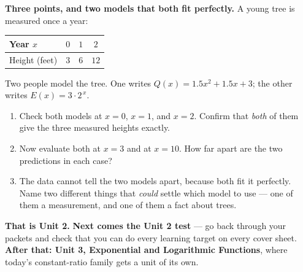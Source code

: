 \documentclass[10pt]{article}
\begin{document}
\boxguard[26]
\begin{extensionbox}
\small
\textbf{Three points, and two models that both fit perfectly.} A young tree is measured once a year:

\smallskip
\renewcommand{\arraystretch}{1.3}
\begin{center}
\begin{tabular}{@{}|l|c|c|c|@{}}
\hline
Year $x$ & $0$ & $1$ & $2$ \\ \hline
Height (feet) & $3$ & $6$ & $12$ \\
\hline
\end{tabular}
\end{center}

\smallskip
Two people model the tree. One writes $Q(x) = 1.5x^2 + 1.5x + 3$; the other writes
$E(x) = 3 \cdot 2^{\,x}$.

\begin{enumerate}[label=(\alph*), leftmargin=1.6em, itemsep=5pt, topsep=4pt]
  \item Check both models at $x=0$, $x=1$, and $x=2$. Confirm that \emph{both} of them give the three
        measured heights exactly.


  \item Now evaluate both at $x=3$ and at $x=10$. How far apart are the two predictions in each case?


  \item The data cannot tell the two models apart, because both fit it perfectly. Name two different
        things that \emph{could} settle which model to use --- one of them a measurement, and one of
        them a fact about trees.

\end{enumerate}
\end{extensionbox}

\vspace{0.10in}

\begin{remindbox}
\small
\textbf{That is Unit 2.} \textbf{Next comes the Unit 2 test} --- go back through your packets and
check that you can do every learning target on every cover sheet. \textbf{After that: Unit 3,
Exponential and Logarithmic Functions}, where today's constant-ratio family gets a unit of its own.
\end{remindbox}
\end{document}
